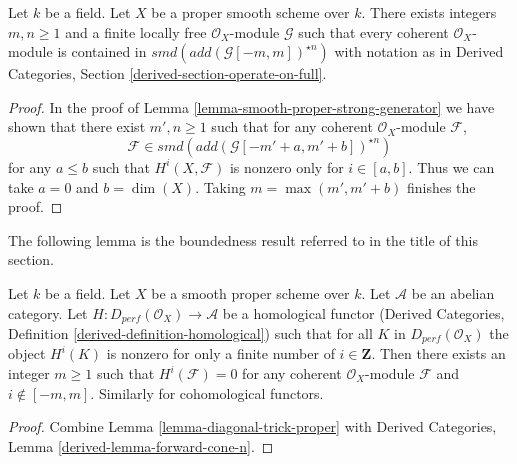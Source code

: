 \begin{lemma}
\label{lemma-diagonal-trick-proper}
Let $k$ be a field. Let $X$ be a proper smooth scheme over $k$.
There exists integers $m, n \geq 1$ and a finite locally free
$\mathcal{O}_X$-module $\mathcal{G}$ such that every coherent
$\mathcal{O}_X$-module is contained in $smd(add(\mathcal{G}[-m, m])^{\star n})$
with notation as in Derived Categories, Section
\ref{derived-section-operate-on-full}.
\end{lemma}

\begin{proof}
In the proof of Lemma \ref{lemma-smooth-proper-strong-generator}
we have shown that there exist $m', n \geq 1$ such that for any
coherent $\mathcal{O}_X$-module $\mathcal{F}$,
$$
\mathcal{F} \in smd(add(\mathcal{G}[-m' + a, m' + b])^{\star n})
$$
for any $a \leq b$ such that $H^i(X, \mathcal{F})$ is nonzero only
for $i \in [a, b]$. Thus we can take $a = 0$ and $b = \dim(X)$.
Taking $m = \max(m', m' + b)$ finishes the proof.
\end{proof}

\noindent
The following lemma is the boundedness result referred to
in the title of this section.

\begin{lemma}
\label{lemma-boundedness}
Let $k$ be a field. Let $X$ be a smooth proper scheme over $k$.
Let $\mathcal{A}$ be an abelian category. Let
$H : D_{perf}(\mathcal{O}_X) \to \mathcal{A}$ be a homological
functor (Derived Categories, Definition \ref{derived-definition-homological})
such that for all $K$ in $D_{perf}(\mathcal{O}_X)$ the object
$H^i(K)$ is nonzero for only a finite number of $i \in \mathbf{Z}$.
Then there exists an integer $m \geq 1$ such that
$H^i(\mathcal{F}) = 0$ for any coherent $\mathcal{O}_X$-module
$\mathcal{F}$ and $i \not \in [-m, m]$.
Similarly for cohomological functors.
\end{lemma}

\begin{proof}
Combine Lemma \ref{lemma-diagonal-trick-proper} with
Derived Categories, Lemma \ref{derived-lemma-forward-cone-n}.
\end{proof}

